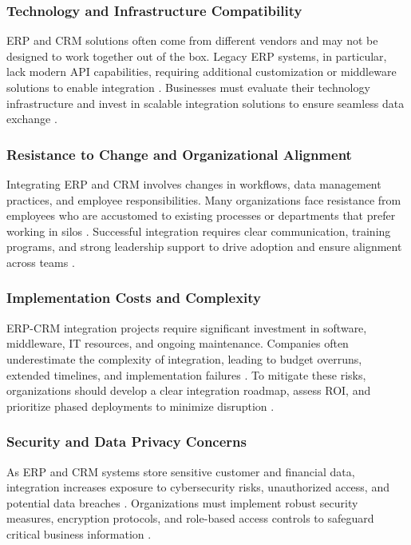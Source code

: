 \subsubsection{Technology and Infrastructure Compatibility}
ERP and CRM solutions often come from different vendors and may not be designed to work together out of the box. Legacy ERP systems, in particular, lack modern API capabilities, requiring additional customization or middleware solutions to enable integration \cite{shaul2013}. Businesses must evaluate their technology infrastructure and invest in scalable integration solutions to ensure seamless data exchange \cite{hendricks2007}.

\subsubsection{Resistance to Change and Organizational Alignment}
Integrating ERP and CRM involves changes in workflows, data management practices, and employee responsibilities. Many organizations face resistance from employees who are accustomed to existing processes or departments that prefer working in silos \cite{gebreyes2018}. Successful integration requires clear communication, training programs, and strong leadership support to drive adoption and ensure alignment across teams \cite{ruivo2014}.

\subsubsection{Implementation Costs and Complexity}
ERP-CRM integration projects require significant investment in software, middleware, IT resources, and ongoing maintenance. Companies often underestimate the complexity of integration, leading to budget overruns, extended timelines, and implementation failures \cite{mestre2015}. To mitigate these risks, organizations should develop a clear integration roadmap, assess ROI, and prioritize phased deployments to minimize disruption \cite{hendricks2007}.

\subsubsection{Security and Data Privacy Concerns}
As ERP and CRM systems store sensitive customer and financial data, integration increases exposure to cybersecurity risks, unauthorized access, and potential data breaches \cite{devarashetty2023}. Organizations must implement robust security measures, encryption protocols, and role-based access controls to safeguard critical business information \cite{ruivo2014}.


